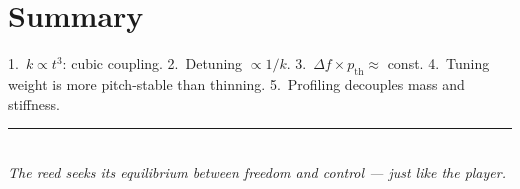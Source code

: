 \documentclass[11pt,a4paper]{article}
\begin{document}
\section{Summary}
\begin{keybox}
1.~$k \propto t^3$: cubic coupling. 2.~Detuning $\propto 1/k$. 3.~$\Delta f \times p_\text{th} \approx$ const. 4.~Tuning weight is more pitch-stable than thinning. 5.~Profiling decouples mass and stiffness.
\end{keybox}

\begin{center}
\textcolor{accentred}{\rule{0.6\textwidth}{1pt}}\\[4pt]
{\small\itshape The reed seeks its equilibrium between freedom and control --- just like the player.}
\end{center}
\end{document}
